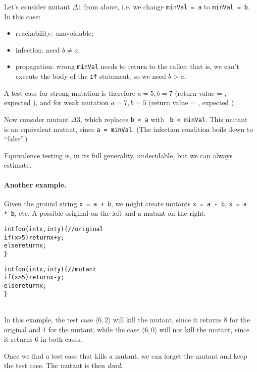 \documentclass[11pt]{article}
\begin{document}
Let's consider mutant $\Delta 1$ from above, i.e. we change
{\tt minVal = a} to {\tt minVal = b}. In this case:
\begin{itemize}[noitemsep]
\item reachability: unavoidable;
\item infection: need $b \neq a$;
\item propagation: wrong {\tt minVal} needs to return to the caller;
that is, we can't execute the body of the {\tt if} statement, so we
need $b > a$.
\end{itemize}
A test case for strong mutation is therefore $a = 5, b = 7$ (return
value = \textvisiblespace, expected \textvisiblespace), and for
weak mutation $a = 7, b = 5$ (return value = \textvisiblespace, expected
\textvisiblespace).

Now consider mutant $\Delta 3$, which replaces {\tt b < a} with {\tt 
b < minVal}. This mutant is an equivalent mutant, since {\tt a = minVal}.
(The infection condition boils down to ``false''.)

Equivalence testing is, in its full generality, undecidable, but we can always
estimate.

\paragraph{Another example.} Given the ground string {\tt x = a + b},
we might create mutants {\tt x = a - b}, {\tt x = a * b}, etc.
A possible original on the
left and a mutant on the right:

\begin{minipage}{.5\textwidth} 
\begin{alltt}
int foo(int x, int y) \{ // original
  if (x > 5) return x + y;
  else return x;
\}
\end{alltt}
\end{minipage}\begin{minipage}{.5\textwidth}
\begin{alltt}
int foo(int x, int y) \{ // mutant
  if (x > 5) return x - y;
  else return x;
\}
\end{alltt}
\end{minipage}
~\\[3em]
In this example, the test case $\langle 6, 2 \rangle$ will kill
 the mutant, since it returns 8 for the original and 4 for the mutant,
while the case $\langle 6, 0 \rangle$ will not kill the mutant,
since it returns 6 in both cases.

Once we find a test case that kills a mutant, we can forget the
mutant and keep the test case. The mutant is then \emph{dead}.
\end{document}
